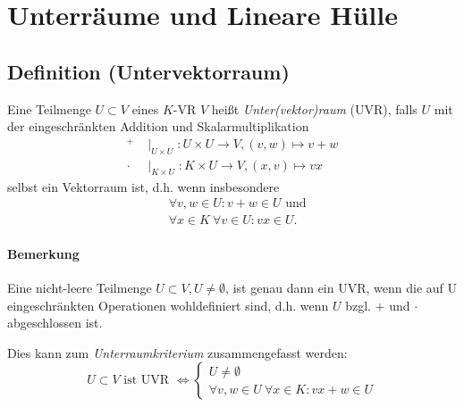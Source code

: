 \section{Unterräume und Lineare Hülle}
\subsection{Definition (Untervektorraum)}
	\begin{Definition}[Untervektorraum]
		Eine Teilmenge $U\subset V$ eines $K$-VR $V$ heißt \emph{Unter(vektor)raum} (UVR), falls $U$ mit der eingeschränkten Addition und Skalarmultiplikation
                \begin{align*}
                        ^+    & \mid_{U\times U}: U\times U \to V,(v,w) \mapsto v+w \\
                        \cdot & \mid_{K\times U}: K\times U \to V,(x,v) \mapsto vx
                \end{align*}
                selbst ein Vektorraum ist, d.h. wenn insbesondere
                \begin{align*}
                        &\forall v,w \in U: v+w\in U \text{ und}\\
                        &\forall x\in K\ \forall v\in U: vx\in U.
                \end{align*}
	\end{Definition}

\paragraph{Bemerkung}
	Eine nicht-leere Teilmenge $U\subset V, U\neq\emptyset$, ist genau dann ein UVR, wenn die auf U eingeschränkten Operationen wohldefiniert sind, d.h. wenn $ U $ bzgl. $ + $ und $ \cdot $ abgeschlossen ist.

	Dies kann zum \emph{Unterraumkriterium} zusammengefasst werden:
	\begin{equation*}
		U\subset V \text{ ist UVR }\Leftrightarrow 
 		 \begin{cases}
 		 	U\neq\emptyset\\
 		 	\forall v,w\in U\ \forall x\in K: vx+w\in U
 		 \end{cases}
	\end{equation*}

